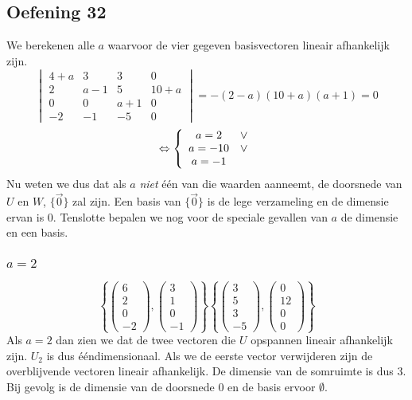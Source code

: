 \documentclass[lineaire_algebra_oplossingen.tex]{subfiles}
\begin{document}
\subsection{Oefening 32}
We berekenen alle $a$ waarvoor de vier gegeven basisvectoren lineair afhankelijk zijn.
\[
\begin{vmatrix}
4+a & 3 & 3 & 0\\
2 & a-1 & 5 & 10+a\\
0 & 0 & a+1 & 0\\
-2 & -1 & -5 & 0
\end{vmatrix}
= -(2-a)(10+a)(a+1)=0
\]
\[
\Leftrightarrow 
\left\lbrace
\begin{array}{c c}
a = 2 &\vee\\
a = -10 &\vee\\
a = -1\\
\end{array}
\right.
\]
Nu weten we dus dat als $a$ \textit{niet} \'e\'en van die waarden aanneemt, de doorsnede van $U$ en $W$, $\{\vec{0}\}$ zal zijn. Een basis van $\{\vec{0}\}$ is de lege verzameling en de dimensie ervan is $0$.
Tenslotte bepalen we nog voor de speciale gevallen van $a$ de dimensie en een basis.
\subsubsection*{$a = 2$}
\[
\left\lbrace
\begin{pmatrix}
6\\2\\0\\-2
\end{pmatrix}
,
\begin{pmatrix}
3\\1\\0\\-1
\end{pmatrix}
\right\rbrace
\left\lbrace
\begin{pmatrix}
3\\5\\3\\-5
\end{pmatrix}
,
\begin{pmatrix}
0\\12\\0\\0
\end{pmatrix}
\right\rbrace
\]
Als $a=2$ dan zien we dat de twee vectoren die $U$ opspannen lineair afhankelijk zijn. $U_2$ is dus \'e\'endimensionaal. Als we de eerste vector verwijderen zijn de overblijvende vectoren lineair afhankelijk. De dimensie van de somruimte is dus $3$. Bij gevolg is de dimensie van de doorsnede $0$ en de basis ervoor $\emptyset$.
\end{document}
